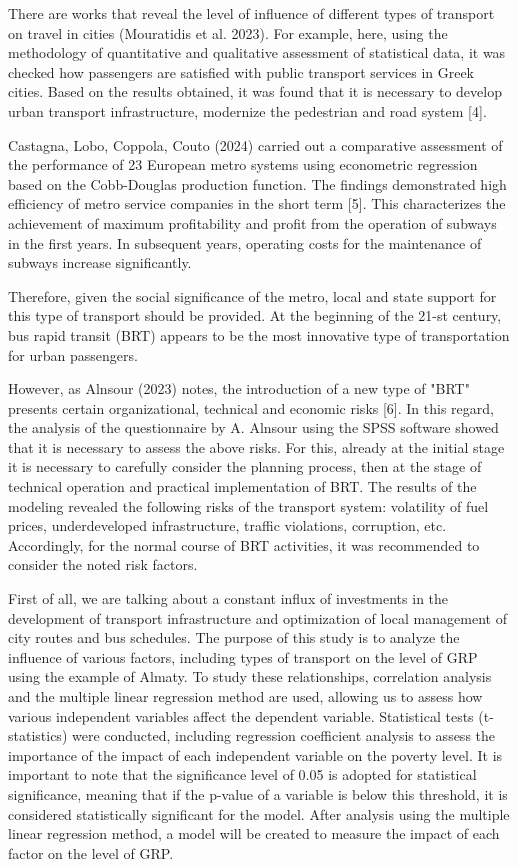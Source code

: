 There are works that reveal the level of influence of different types of
transport on travel in cities (Mouratidis et al. 2023). For example,
here, using the methodology of quantitative and qualitative assessment
of statistical data, it was checked how passengers are satisfied with
public transport services in Greek cities. Based on the results
obtained, it was found that it is necessary to develop urban transport
infrastructure, modernize the pedestrian and road system {[}4{]}.

Castagna, Lobo, Coppola, Couto (2024) carried out a comparative
assessment of the performance of 23 European metro systems using
econometric regression based on the Cobb-Douglas production function.
The findings demonstrated high efficiency of metro service companies in
the short term {[}5{]}. This characterizes the achievement of maximum
profitability and profit from the operation of subways in the first
years. In subsequent years, operating costs for the maintenance of
subways increase significantly.

Therefore, given the social significance of the metro, local and state
support for this type of transport should be provided. At the beginning
of the 21-st century, bus rapid transit (BRT) appears to be the most
innovative type of transportation for urban passengers.

However, as Alnsour (2023) notes, the introduction of a new type of
"BRT" presents certain organizational, technical and economic risks
{[}6{]}. In this regard, the analysis of the questionnaire by A. Alnsour
using the SPSS software showed that it is necessary to assess the above
risks. For this, already at the initial stage it is necessary to
carefully consider the planning process, then at the stage of technical
operation and practical implementation of BRT. The results of the
modeling revealed the following risks of the transport system:
volatility of fuel prices, underdeveloped infrastructure, traffic
violations, corruption, etc. Accordingly, for the normal course of BRT
activities, it was recommended to consider the noted risk factors.

First of all, we are talking about a constant influx of investments in
the development of transport infrastructure and optimization of local
management of city routes and bus schedules. The purpose of this study
is to analyze the influence of various factors, including types of
transport on the level of GRP using the example of Almaty. To study
these relationships, correlation analysis and the multiple linear
regression method are used, allowing us to assess how various
independent variables affect the dependent variable. Statistical tests
(t-statistics) were conducted, including regression coefficient analysis
to assess the importance of the impact of each independent variable on
the poverty level. It is important to note that the significance level
of 0.05 is adopted for statistical significance, meaning that if the
p-value of a variable is below this threshold, it is considered
statistically significant for the model. After analysis using the
multiple linear regression method, a model will be created to measure
the impact of each factor on the level of GRP.

